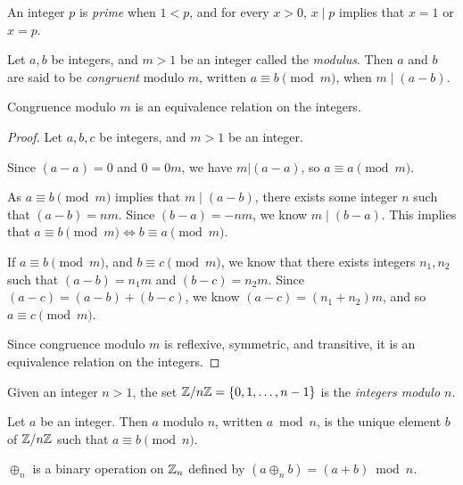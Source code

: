\begin{defn}
    An integer $p$ is \emph{prime} when $1 < p$, and for every $x > 0$, $x \mid p$ implies that $x = 1$ or $x = p$.
\end{defn}

\begin{defn}\label{modular-congruence}
    Let $a, b$ be integers, and $m > 1$ be an integer called the \emph{modulus}. Then $a$ and $b$ are said to be \emph{congruent} modulo $m$, written $a \equiv b \pmod m$, when $m\mid(a - b)$.
\end{defn}

\begin{thm}\label{modular-congruence-equivalence}
    Congruence modulo $m$ is an equivalence relation on the integers.
\end{thm}

\begin{proof} Let $a, b, c$ be integers, and $m > 1$ be an integer.

    Since $(a-a) = 0$ and $0 = 0m$, we have $m|(a-a)$, so $a \equiv a \pmod m$.

    As $a \equiv b \pmod m$ implies that $m\mid(a - b)$, there exists some integer $n$ such that $(a - b) = nm$. Since $(b - a) = -nm$, we know $m\mid(b-a)$. This implies that $a \equiv b \pmod m \iff b \equiv a \pmod m$.

    If $a \equiv b \pmod m$, and $b \equiv c \pmod m$, we know that there exists integers $n_1, n_2$ such that $(a-b) = n_1m$ and $(b-c) = n_2m$. Since $(a-c) = (a-b) + (b-c)$, we know $(a-c) = (n_1 + n_2)m$, and so $a \equiv c \pmod m$.

    Since congruence modulo $m$ is reflexive, symmetric, and transitive, it is an equivalence relation on the integers.
\end{proof}

\begin{defn}\label{mod-n}
    Given an integer $n > 1$, the set $\mathbb{Z}/n\mathbb{Z} = \{0, 1, \ldots, n-1\}$ is the \emph{integers modulo $n$}.
\end{defn}

\begin{defn}\label{modulo}
    Let $a$ be an integer. Then $a$ modulo $n$, written $a \bmod n$, is the unique element $b$ of $\mathbb{Z}/n\mathbb{Z}$ such that $a \equiv b \pmod n$.
\end{defn}

\begin{defn}
    $\oplus_n$ is a binary operation on $\mathbb{Z}_n$ defined by $(a \oplus_n b) = (a + b)\bmod n$.
\end{defn}

